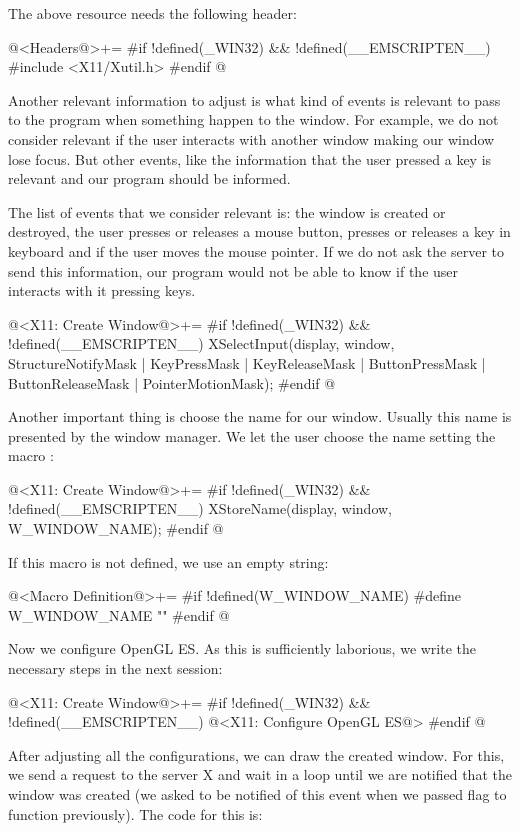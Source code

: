 The above resource needs the following header:

\iniciocodigo
@<Headers@>+=
#if !defined(_WIN32) && !defined(__EMSCRIPTEN__)
#include <X11/Xutil.h>
#endif
@
\fimcodigo

Another relevant information to adjust is what kind of events is
relevant to pass to the program when something happen to the
window. For example, we do not consider relevant if the user interacts
with another window making our window lose focus. But other events,
like the information that the user pressed a key is relevant and our
program should be informed.

The list of events that we consider relevant is: the window is created
or destroyed, the user presses or releases a mouse button, presses or
releases a key in keyboard and if the user moves the mouse pointer. If
we do not ask the server to send this information, our program would
not be able to know if the user interacts with it pressing keys.

\iniciocodigo
@<X11: Create Window@>+=
#if !defined(_WIN32) && !defined(__EMSCRIPTEN__)
XSelectInput(display, window, StructureNotifyMask | KeyPressMask |
                              KeyReleaseMask | ButtonPressMask |
                              ButtonReleaseMask | PointerMotionMask);
#endif
@
\fimcodigo

Another important thing is choose the name for our window. Usually
this name is presented by the window manager. We let the user choose
the name setting the macro :

\iniciocodigo
@<X11: Create Window@>+=
#if !defined(_WIN32) && !defined(__EMSCRIPTEN__)
XStoreName(display, window, W_WINDOW_NAME);
#endif
@
\fimcodigo

If this macro is not defined, we use an empty string:

@<Macro Definition@>+=
#if !defined(W_WINDOW_NAME)
#define W_WINDOW_NAME ""
#endif
@
\fimcodigo

Now we configure OpenGL ES. As this is sufficiently laborious, we
write the necessary steps in the next session:

\iniciocodigo
@<X11: Create Window@>+=
#if !defined(_WIN32) && !defined(__EMSCRIPTEN__)
@<X11: Configure OpenGL ES@>
#endif
@
\fimcodigo

After adjusting all the configurations, we can draw the created
window. For this, we send a request to the server X and wait in a loop
until we are notified that the window was created (we asked to be
notified of this event when we passed
flag  to
function  previously). The code for this is:

